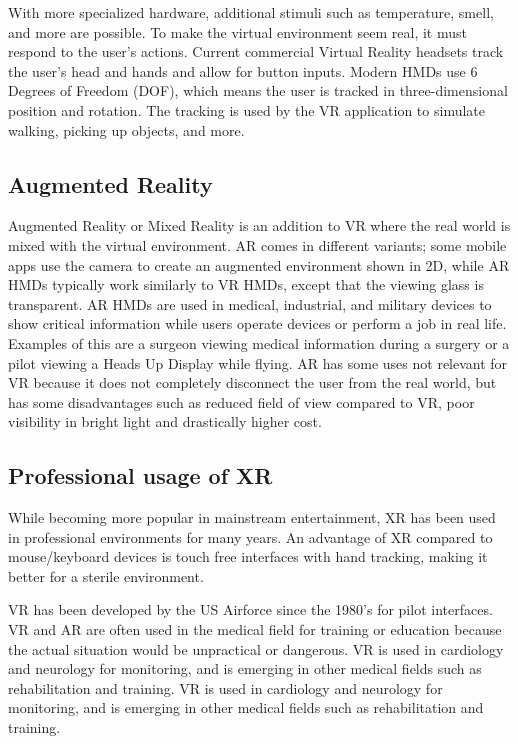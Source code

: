 \documentclass[a4paper]{report}
\begin{document}
With more specialized hardware, additional stimuli such as temperature, smell, and more are possible\cite{noauthor_feelreal_nodate}.
To make the virtual environment seem real, it must respond to the user's actions. Current commercial Virtual Reality headsets track the user's head and hands and allow for button inputs\cite{noauthor_oculus_nodate}. Modern HMDs use 6 Degrees of Freedom (DOF), which means the user is tracked in three-dimensional position and rotation\cite{lang_introduction_2013}. The tracking is used by the VR application to simulate walking, picking up objects, and more.

\subsection{ Augmented Reality }
Augmented Reality or Mixed Reality is an addition to VR where the real world is mixed with the virtual environment\cite{hackett_three-dimensional_2016}. AR comes in different variants; some mobile apps use the camera to create an augmented environment shown in 2D, while AR HMDs typically work similarly to VR HMDs, except that the viewing glass is transparent.
AR HMDs are used in medical, industrial, and military devices to show critical information while users operate devices or perform a job in real life. Examples of this are a surgeon viewing medical information during a surgery or a pilot viewing a Heads Up Display while flying\cite{mihelj_virtual_2014}\cite{mertz}.
AR has some uses not relevant for VR because it does not completely disconnect the user from the real world, but has some disadvantages such as reduced field of view compared to VR, poor visibility in bright light\cite{hackett_three-dimensional_2016} and drastically higher cost\cite{medical_holodeck_medicalholodeck_nodate}.

\subsection{Professional usage of XR}
While becoming more popular in mainstream entertainment, XR has been used in professional environments for many years.
An advantage of XR compared to mouse/keyboard devices is touch free interfaces with hand tracking, making it better for a sterile environment\cite{andrews_extended_2019}.

VR has been developed by the US Airforce since the 1980's for pilot interfaces\cite{mertz_virtual_2019}. VR and AR are often used in the medical field for training or education because the actual situation would be unpractical or dangerous\cite{freina_immersive_2015}.
VR is used in cardiology and neurology for monitoring, and is emerging in other medical fields such as rehabilitation and training\cite{javaid_virtual_2020}.
VR is used in cardiology and neurology for monitoring, and is emerging in other medical fields such as rehabilitation and training\cite{javaid_virtual_2020}.
\end{document}
